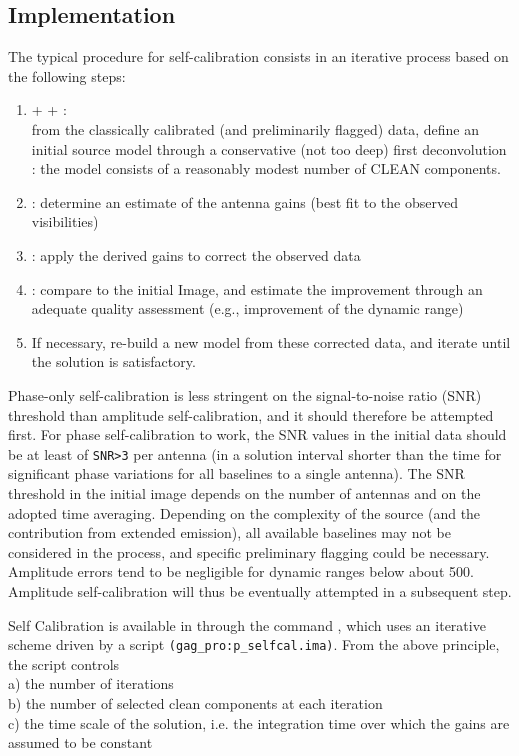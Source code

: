\subsection{Implementation}

The typical procedure for self-calibration consists in an iterative 
process based on the following steps:
\begin{enumerate}\itemsep 0pt
\item {} +  + : \\
from the classically calibrated (and 
preliminarily flagged) data, define an initial source model through a 
conservative (not too deep) first deconvolution : the model consists of 
a reasonably modest number of CLEAN components.
\item {}: determine an estimate of the antenna gains (best fit 
to the observed visibilities)
\item {}: apply the derived gains to correct the observed data
\item {}: compare to the initial Image, and estimate the 
improvement through an adequate quality assessment (e.g., improvement 
of the dynamic range)
\item If necessary, re-build a new model from these corrected data, and 
iterate until the solution is satisfactory.
\end{enumerate}

Phase-only self-calibration is less stringent on the signal-to-noise 
ratio (SNR) threshold than amplitude self-calibration, and it should 
therefore be attempted first. For phase self-calibration to work, the 
SNR values in the initial data should be at least of \texttt{SNR>3} per 
antenna (in a solution interval shorter than the time for significant 
phase variations for all baselines to a single antenna). The SNR 
threshold in the initial image depends on the number of antennas and on 
the adopted time averaging. Depending on the complexity of the source 
(and the contribution from extended emission), all available baselines 
may not be considered in the process, and specific preliminary flagging 
could be necessary. Amplitude errors tend to be negligible for dynamic 
ranges below about 500. Amplitude self-calibration will thus 
be eventually attempted in a subsequent step.

Self Calibration is available in \imager{} through the command 
, which uses an iterative scheme driven by a script 
\texttt{(gag\_pro:p\_selfcal.ima)}.  From the above principle, the script 
controls\\
  a) the number of iterations\\
  b) the number of selected clean components at each iteration\\
  c) the time scale of the solution, i.e. the integration time
  over which the gains are assumed to be constant

